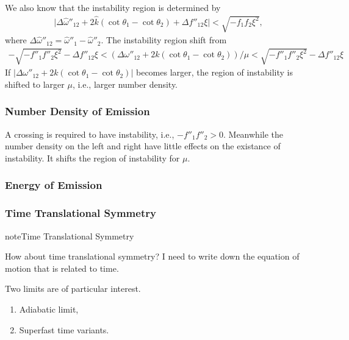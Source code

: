 \documentclass[letterpaper,12pt,english]{sphinxmanual}
\begin{document}
 We also know that the instability region is determined by
\begin{equation*}
\begin{split}\lvert \Delta\hat\omega''_{12} + 2\hat k (\cot \theta_1 - \cot\theta_2) + \Delta f''_{12}\xi \rvert < \sqrt{-f_1f_2\xi^2},\end{split}
\end{equation*}
where \(\Delta \hat \omega''_{12} = \hat\omega''_1-\hat\omega''_2\). The instability region shift from
\begin{equation*}
\begin{split}-\sqrt{-f''_1f''_2\xi^2} -\Delta f''_{12}\xi < (\Delta\omega''_{12} + 2 k(\cot\theta_1-\cot\theta_2))/\mu < \sqrt{-f''_1f''_2\xi^2} -\Delta f''_{12}\xi\end{split}
\end{equation*}
If \(\lvert \Delta\omega''_{12} + 2 k(\cot\theta_1-\cot\theta_2) \rvert\) becomes larger, the region of instability is shifted to larger \(\mu\), i.e., larger number density.


\subsubsection{Number Density of Emission}
\label{\detokenize{collective/some-clarifications:number-density-of-emission}}
A crossing is required to have instability, i.e., \(-f''_1f''_2>0\). Meanwhile the number density on the left and right have little effects on the existance of instability. It shifts the region of instability for \(\mu\).


\subsubsection{Energy of Emission}
\label{\detokenize{collective/some-clarifications:energy-of-emission}}

\subsubsection{Time Translational Symmetry}
\label{\detokenize{collective/some-clarifications:time-translational-symmetry}}
\begin{sphinxadmonition}{note}{Time Translational Symmetry}

How about time translational symmetry? I need to write down the equation of motion that is related to time.

Two limits are of particular interest.
\begin{enumerate}
\item {} 
Adiabatic limit,

\item {} 
Superfast time variants.

\end{enumerate}
\end{sphinxadmonition}
\end{document}
